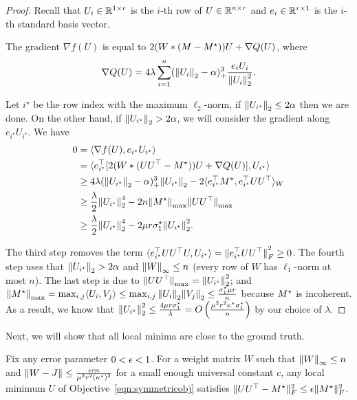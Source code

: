 \begin{proof}
Recall that $U_i \in \mathbb{R}^{1 \times r}$ is the $i$-th row of $U \in \mathbb{R}^{n \times r}$ and $e_i \in \mathbb{R}^{r \times 1}$ is the $i$-th standard basis vector.

The gradient $\nabla f(U)$ is equal to $2(W*(M-M^\star))U + \nabla Q(U)$, where
\[ \nabla Q(U) = 4\lambda \sum_{i=1}^n ({\lVert U_i{\rVert}}_2 - \alpha)_+^3 \frac{e_i U_i}{{\lVert U_i{\rVert}}_2^2}. \]

Let $i^\star$ be the row index with the maximum $\ell_2$-norm, if ${\lVert U_{i^\star}{\rVert}}_2 \le 2\alpha$ then we are done. On the other hand, if ${\lVert U_{i^\star}{\rVert}}_2 > 2\alpha$, we will consider the gradient along $e_{i^\star}U_{i^\star}$. %
We have
\begin{align*}
0 & = \langle \nabla f(U), e_{i^\star}U_{i^\star}\rangle \\
& = \langle e_{i^\star}^\top[2(W*(UU^\top - M^\star))U + \nabla Q(U)], U_{i^\star}\rangle \\
& \ge 4\lambda ({\lVert U_{i^\star}{\rVert}}_2-\alpha)_+^3{\lVert U_{i^\star}{\rVert}}_2 - 2\langle e_{i^\star}^\top M^\star, e_{i^\star}^\top UU^\top\rangle_W \\
& \ge \frac{\lambda}{2}{\lVert U_{i^\star}{\rVert}}_2^4 - 2n {\lVert M^\star{\rVert}}_{\max} {\lVert UU^\top{\rVert}}_{\max} \\
& \ge \frac{\lambda}{2}{\lVert U_{i^\star}{\rVert}}_2^4 - 2\mu r\sigma^\star_1{\lVert U_{i^\star}{\rVert}}_2^2.
\end{align*}

The third step removes the term $\langle e_{i^\star}^\top U U^\top U, U_{i^\star}\rangle = {\lVert e_{i^\star}^\top U U^\top{\rVert}}_F^2 \ge 0$.
The fourth step uses that ${\lVert U_{i^\star}{\rVert}}_2 > 2\alpha$ and ${\lVert W{\rVert}}_\infty \le n$ (every row of $W$ has $\ell_1$-norm at most $n$).
The last step is due to ${\lVert UU^\top{\rVert}}_{\max} = {\lVert U_{i^\star}{\rVert}}_2^2$; and ${\lVert M^\star{\rVert}}_{\max} = \max_{i,j} \langle U_i, V_j\rangle \le \max_{i,j} {\lVert U_i{\rVert}}_2 {\lVert V_j{\rVert}}_2 \le \frac{\sigma^\star_1 \mu r}{n}$ because $M^\star$ is incoherent.
As a result, we know that ${\lVert U_{i^\star}{\rVert}}_2^2 \le \frac{4\mu r\sigma^\star_1}{\lambda} = O\left(\frac{\mu^2 r^2 \kappa^\star \sigma^\star_1}{n}\right)$ by our choice of $\lambda$.
\end{proof}

Next, we will show that all local minima are close to the ground truth.

\begin{lemma}
Fix any error parameter $0 < \epsilon < 1$.
For a weight matrix $W$ such that ${\lVert W{\rVert}}_\infty \le n$ and $\|W-J\| \le \frac{\epsilon cn}{\mu^2 r^2 (\kappa^\star)^2}$ for a small enough universal constant $c$, any local minimum $U$ of Objective~\eqref{eqn:symmetricobj} satisfies $\|UU^\top-M^\star\|_F^2 \le \epsilon \|M^\star\|_F^2$. 
\end{lemma}

